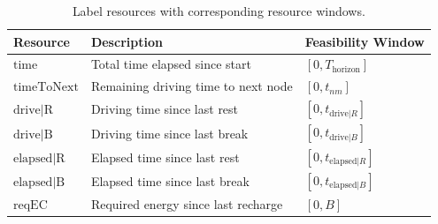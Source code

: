 \documentclass[3p,11pt,authoryear]{elsarticle}  %
\begin{document}
\begin{table}[!htbp]
\centering
\caption{Label resources with corresponding resource windows.}
\label{tab:resource_windows}
\begin{tabular}{@{}lll@{}}
\toprule
\textbf{Resource} & \textbf{Description} & \textbf{Feasibility Window} \\
\midrule
$ \text{time} $ & Total time elapsed since start & $  [0, T_{\text{horizon}}] $ \\
$ \text{timeToNext} $ & Remaining driving time to next node & $ [0, t_{nm}] $ \\
$ \text{drive|R} $ & Driving time since last rest & $ [0, t_{\text{drive}|R}] $ \\
$ \text{drive|B} $ & Driving time since last break & $ [0, t_{\text{drive}|B}] $ \\
$ \text{elapsed|R} $ & Elapsed time since last rest & $ [0, t_{\text{elapsed}|R}] $ \\
$ \text{elapsed|B} $ & Elapsed time since last break & $ [0, t_{\text{elapsed}|B}] $ \\
$ \text{reqEC} $ & Required energy since last recharge & $ [0, B] $ \\
\bottomrule
\end{tabular}
\end{table}
\end{document}
